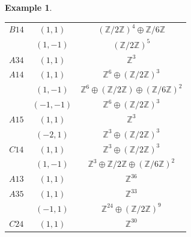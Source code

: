 \documentclass[11pt]{amsart}
\newtheorem{example}[theorem]{Example}
\theoremstyle{definition}
\newcommand{\Z}{\mathbb{Z}}
\begin{document}
\begin{example}
\begin{center}
\begin{tabular}{c|c|c}
    $B14$ & $(1,1)$ & $(\Z/2\Z)^4 \oplus \Z/6 \Z$ \\
        & $(1,-1)$ & $(\Z/2\Z)^5$ \\
    $A34$ & $(1,1)$ & $\Z^3$ \\
    $A14$ & $(1,1)$ & $\Z^6 \oplus (\Z/2\Z)^3$ \\
        & $(1,-1)$ & $\Z^6 \oplus (\Z/2\Z) \oplus (\Z/6\Z)^2$ \\
        & $(-1,-1)$ & $\Z^6 \oplus (\Z/2\Z)^3$ \\
    $A15$ & $(1,1)$ & $\Z^3$ \\
        & $(-2,1)$ & $\Z^3 \oplus (\Z/2\Z)^3$ \\
    $C14$ & $(1,1)$ & $\Z^3 \oplus (\Z/2\Z)^3$ \\
        & $(1,-1)$ & $\Z^3 \oplus \Z/2\Z \oplus (\Z/6\Z)^2$ \\
    $A13$ & $(1,1)$ & $\Z^{36}$ \\
    $A35$ & $(1,1)$ & $\Z^{33}$ \\
        & $(-1,1)$ & $\Z^{24} \oplus (\Z/2\Z)^9$ \\
    $C24$ & $(1,1)$ & $\Z^{30}$ \\
\end{tabular}

\end{center}

\end{example}
\end{document}
